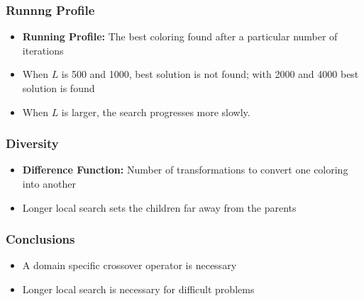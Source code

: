 \documentclass{beamer}
\begin{document}
\begin{frame}
\frametitle{Runnng Profile}
\begin{itemize}
\item {\bf Running Profile:} The best coloring found after a particular number of iterations
\item When $L$ is 500 and 1000, best solution is not found; with 2000 and 4000 best solution is found
\item When $L$ is larger, the search progresses more slowly.
\end{itemize}
\end{frame}

\begin{frame}
\frametitle{Diversity}
\begin{itemize}
\item {\bf Difference Function:} Number of transformations to convert one coloring into another 
\item Longer local search sets the children far away from the parents
\end{itemize}
\end{frame}







\begin{frame}
\frametitle{Conclusions}
\begin{itemize}
\item A domain specific crossover operator is necessary
\item Longer local search is necessary for difficult problems
\end{itemize}
\end{frame} 
\end{document}
